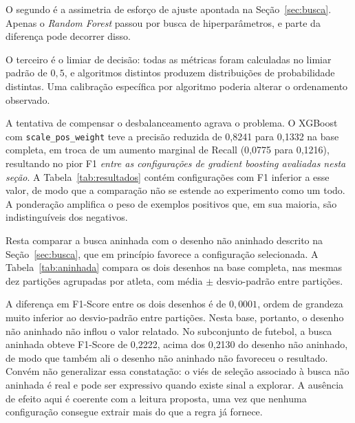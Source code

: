 O segundo é a assimetria de esforço de ajuste apontada na Seção~\ref{sec:busca}. Apenas o \textit{Random Forest} passou por busca de hiperparâmetros, e parte da diferença pode decorrer disso.

O terceiro é o limiar de decisão: todas as métricas foram calculadas no limiar padrão de $0{,}5$, e algoritmos distintos produzem distribuições de probabilidade distintas. Uma calibração específica por algoritmo poderia alterar o ordenamento observado.

A tentativa de compensar o desbalanceamento agrava o problema. O XGBoost com \texttt{scale\_pos\_weight} teve a precisão reduzida de 0{,}8241 para 0{,}1332 na base completa, em troca de um aumento marginal de Recall (0{,}0775 para 0{,}1216), resultando no pior F1 \textit{entre as configurações de gradient boosting avaliadas nesta seção}. A Tabela~\ref{tab:resultados} contém configurações com F1 inferior a esse valor, de modo que a comparação não se estende ao experimento como um todo. A ponderação amplifica o peso de exemplos positivos que, em sua maioria, são indistinguíveis dos negativos.

Resta comparar a busca aninhada com o desenho não aninhado descrito na Seção~\ref{sec:busca}, que em princípio favorece a configuração selecionada. A Tabela~\ref{tab:aninhada} compara os dois desenhos na base completa, nas mesmas dez partições agrupadas por atleta, com média $\pm$ desvio-padrão entre partições.

\begin{table}[H]
\centering
\caption{Busca de hiperparâmetros não aninhada e aninhada.}
\label{tab:aninhada}
\end{table}

A diferença em F1-Score entre os dois desenhos é de $0{,}0001$, ordem de grandeza muito inferior ao desvio-padrão entre partições. Nesta base, portanto, o desenho não aninhado não inflou o valor relatado. No subconjunto de futebol, a busca aninhada obteve F1-Score de 0{,}2222, acima dos 0{,}2130 do desenho não aninhado, de modo que também ali o desenho não aninhado não favoreceu o resultado. Convém não generalizar essa constatação: o viés de seleção associado à busca não aninhada é real e pode ser expressivo quando existe sinal a explorar. A ausência de efeito aqui é coerente com a leitura proposta, uma vez que nenhuma configuração consegue extrair mais do que a regra já fornece.

